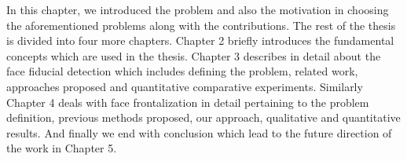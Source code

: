 % 
%     
% 

In this chapter, we introduced the problem and also the motivation
in choosing the aforementioned problems along with the contributions.
The rest of the thesis is divided into four more chapters. Chapter 2 briefly introduces the
fundamental concepts which are used in the thesis. Chapter 3 describes in detail
about the face fiducial detection which includes defining the problem, related work, 
approaches proposed and quantitative comparative experiments. Similarly Chapter 4 deals
with face frontalization in detail pertaining to the problem definition, previous methods
proposed, our approach, qualitative and quantitative results. And finally we end with
conclusion which lead to the future direction of the work in Chapter 5.
